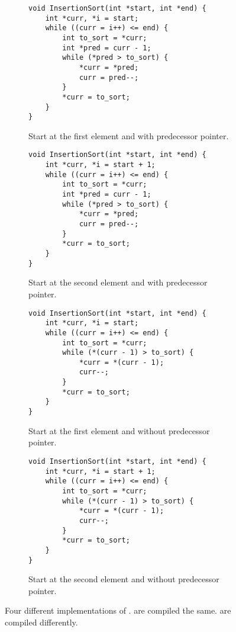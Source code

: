 \begin{figure}
	\lstset{basicstyle=\ttfamily\small}
	\def\iscodewidth{0.47\linewidth}
	\begin{subfigure}{\iscodewidth}
		\begin{lstlisting}
void InsertionSort(int *start, int *end) {
	int *curr, *i = start;
	while ((curr = i++) <= end) {
		int to_sort = *curr;
		int *pred = curr - 1;
		while (*pred > to_sort) {
			*curr = *pred;
			curr = pred--;
		}
		*curr = to_sort;
	}
}
		\end{lstlisting}
		\caption{
			Start at the first element and with predecessor pointer.
		}
		\label{fig:insertion:impl:pred_first}
	\end{subfigure}
	\hfill
	\begin{subfigure}{\iscodewidth}
		\begin{lstlisting}
void InsertionSort(int *start, int *end) {
	int *curr, *i = start + 1;
	while ((curr = i++) <= end) {
		int to_sort = *curr;
		int *pred = curr - 1;
		while (*pred > to_sort) {
			*curr = *pred;
			curr = pred--;
		}
		*curr = to_sort;
	}
}
		\end{lstlisting}
		\caption{
			Start at the second element and with predecessor pointer.
		}
		\label{fig:insertion:impl:pred_sec}
	\end{subfigure}

	\begin{subfigure}{\iscodewidth}
		\begin{lstlisting}
void InsertionSort(int *start, int *end) {
	int *curr, *i = start;
	while ((curr = i++) <= end) {
		int to_sort = *curr;
		while (*(curr - 1) > to_sort) {
			*curr = *(curr - 1);
			curr--;
		}
		*curr = to_sort;
	}
}
		\end{lstlisting}
		\caption{
			Start at the first element and without predecessor pointer.
		}
		\label{fig:insertion:impl:offset_first}
	\end{subfigure}
	\hfill
	\begin{subfigure}{\iscodewidth}
		\begin{lstlisting}
void InsertionSort(int *start, int *end) {
	int *curr, *i = start + 1;
	while ((curr = i++) <= end) {
		int to_sort = *curr;
		while (*(curr - 1) > to_sort) {
			*curr = *(curr - 1);
			curr--;
		}
		*curr = to_sort;
	}
}
		\end{lstlisting}
		\caption{
			Start at the second element and without predecessor pointer.
		}
		\label{fig:insertion:impl:offset_sec}
	\end{subfigure}
	\caption{
		Four different implementations of \IS{}.
		 are compiled the same.
		 are compiled differently.
	}
\end{figure}

